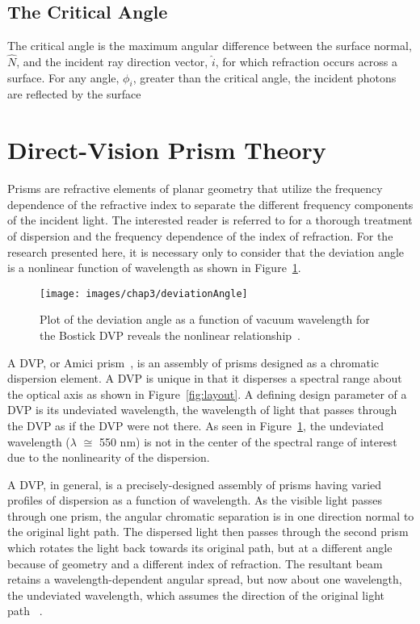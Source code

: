 \subsection{The Critical Angle}
\label{sec:criticalAngle}
The critical angle is the maximum angular difference between the surface normal, $\hat{N}$, and the incident ray direction vector, $\hat{i}$, for which refraction occurs across a surface. For any angle, $\phi_i$, greater than the critical angle, the incident photons are reflected by the surface~\cite{Hecht}

\section{Direct-Vision Prism Theory}
\label{sec:prismTheory}

Prisms are refractive elements of planar geometry that utilize the frequency dependence of the refractive index to separate the different frequency components of the incident light. The interested reader is referred to \cite{Hecht} for a thorough treatment of dispersion and the frequency dependence of the index of refraction. For the research presented here, it is necessary only to consider that the deviation angle is a nonlinear function of wavelength  as shown in Figure~\ref{fig:bostickDispersion}.

\begin{figure}[htb]		%
\centering
\texttt{[image: images/chap3/deviationAngle]}
\caption{Plot of the deviation angle as a function of vacuum wavelength for the Bostick \acl{DVP} reveals the nonlinear relationship~\cite{Niederhauser}.}
\label{fig:bostickDispersion}
\end{figure}

A \ac{DVP}, or Amici prism~\cite{Hagen11}, is an assembly of prisms designed as a chromatic dispersion element. A \ac{DVP} is unique in that it disperses a spectral range about the optical axis as shown in Figure~\ref{fig:layout}. A defining design parameter of a \ac{DVP} is its undeviated wavelength, the wavelength of light that passes through the \ac{DVP} as if the \ac{DVP} were not there. As seen in Figure~\ref{fig:bostickDispersion}, the undeviated wavelength ($\lambda$ $\cong$ 550 nm) is not in the center of the spectral range of interest due to the nonlinearity of the dispersion.

A \ac{DVP}, in general, is a precisely-designed assembly of prisms having varied profiles of dispersion as a function of wavelength. As the visible light passes through one prism, the angular chromatic separation is in one direction normal to the original light path. The dispersed light then passes through the second prism which rotates the light back towards its original path, but at a different angle because of geometry and a different index of refraction. The resultant beam retains a wavelength-dependent angular spread, but now about one wavelength, the undeviated wavelength, which assumes the direction of the original light path~\cite{Ebizuka} \cite{Bostick09}.

